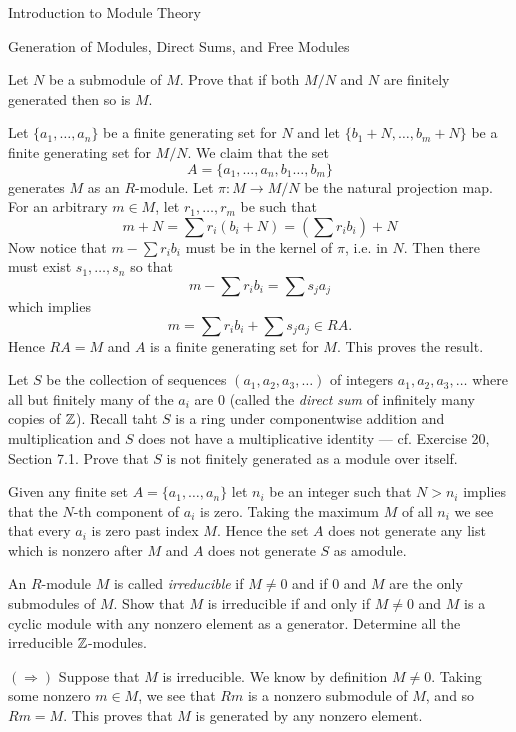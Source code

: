 \begin{chapter}{Introduction to Module Theory}
\begin{section}{Generation of Modules, Direct Sums, and Free Modules}
\begin{problem}\label{ex:10.3.7}
Let $N$ be a submodule of $M$. Prove that if both $M/N$ and $N$ are finitely generated then so is $M$.
\end{problem}
\begin{solution}
Let $\{a_1,\ldots, a_n\}$ be a finite generating set for $N$ and let $\{b_1+N,\ldots, b_m+N\}$ be a finite generating set for $M/N$. We claim that the set \[
A = \{a_1,\ldots, a_n,b_1\ldots, b_m\}
\]
generates $M$ as an $R$-module. Let $\pi:M\to M/N$ be the natural projection map. For an arbitrary $m\in M$, let $r_1,\ldots, r_m$ be such that \[
m+N = \sum r_i (b_i+N) = \left(\sum r_i b_i \right) + N
\]
Now notice that $m-\sum r_ib_i$ must be in the kernel of $\pi$, i.e. in $N$. Then there must exist $s_1,\ldots, s_n$ so that \[
m-\sum r_ib_i = \sum s_j a_j
\]
which implies \[
m = \sum r_ib_i + \sum s_j a_j \in RA.
\]
Hence $RA = M$ and $A$ is a finite generating set for $M$. This proves the result.
\end{solution}\oneperpage



\begin{problem}\label{ex:10.3.8}
Let $S$ be the collection of sequences $(a_1,a_2,a_3,\ldots)$ of integers $a_1,a_2,a_3,\ldots$ where all but finitely many of the $a_i$ are 0 (called the \emph{direct sum} of infinitely many copies of $\mathbb{Z}$). Recall taht $S$ is a ring under componentwise addition and multiplication and $S$ does not have a multiplicative identity --- cf. Exercise 20, Section 7.1. Prove that $S$ is not finitely generated as a module over itself. 
\end{problem}
\begin{solution}
Given any finite set $A=\{a_1,\ldots, a_n\}$ let $n_i$ be an integer such that $N>n_i$ implies that the $N$-th component of $a_i$ is zero. Taking the maximum $M$ of all $n_i$ we see that every $a_i$ is zero past index $M$. Hence the set $A$ does not generate any list which is nonzero after $M$ and $A$ does not generate $S$ as amodule. 
\end{solution}\oneperpage



\begin{problem}\label{ex:10.3.9}
An $R$-module $M$ is called \emph{irreducible} if $M\neq 0$ and if $0$ and $M$ are the only submodules of $M$. Show that $M$ is irreducible if and only if $M\neq 0$ and $M$ is a cyclic module with any nonzero element as a generator. Determine all the irreducible $\mathbb{Z}$-modules. 
\end{problem}
\begin{solution}$(\Rightarrow)$ Suppose that $M$ is irreducible. We know by definition $M\neq 0$. Taking some nonzero $m\in M$, we see that $Rm$ is a nonzero submodule of $M$, and so $Rm = M$. This proves that $M$ is generated by any nonzero element.


\end{solution}
\end{section}
\end{chapter}
